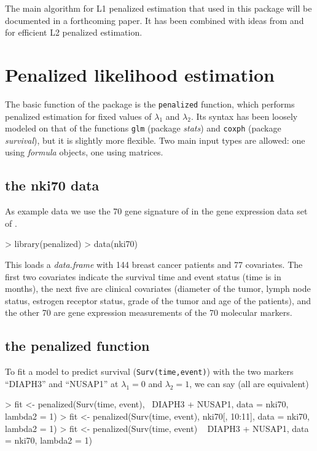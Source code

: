 \documentclass[a4paper]{article}
\newcommand{\Robject}[1]{{\texttt{#1}}}
\newcommand{\Rfunction}[1]{{\texttt{#1}}}
\newcommand{\Rpackage}[1]{{\textit{#1}}}
\newcommand{\Rclass}[1]{{\textit{#1}}}
\begin{document}
The main algorithm for L1 penalized estimation that used in this package will be documented in a forthcoming paper. It has been combined with ideas from \cite{Eilers2001} and \cite{Houwelingen2006} for efficient L2 penalized estimation.


\section{Penalized likelihood estimation}

The basic function of the package is the \Rfunction{penalized} function, which performs penalized estimation for fixed values of $\lambda_1$ and $\lambda_2$. Its syntax has been loosely modeled on that of the functions \Rfunction{glm} (package \Rpackage{stats}) and \Rfunction{coxph} (package \Rpackage{survival}), but it is slightly more flexible. Two main input types are allowed: one using \Rclass{formula} objects, one using matrices.

\subsection{the nki70 data}

As example data we use the 70 gene signature of \cite{Veer2002} in the gene expression data set of \cite{Vijver2002}.

\begin{Schunk}
\begin{Sinput}
> library(penalized)
> data(nki70)
\end{Sinput}
\end{Schunk}

This loads a \Rclass{data.frame} with 144 breast cancer patients and 77 covariates. The first two covariates indicate the survival time and event status (time is in months), the next five are clinical covariates (diameter of the tumor, lymph node status, estrogen receptor status, grade of the tumor and age of the patients), and the other 70 are gene expression measurements of the 70 molecular markers.

\subsection{the penalized function}

To fit a model to predict survival (\Robject{Surv(time,event)}) with the two markers ``DIAPH3'' and ``NUSAP1'' at $\lambda_1 = 0$ and $\lambda_2 = 1$, we can say (all are equivalent)

\begin{Schunk}
\begin{Sinput}
> fit <- penalized(Surv(time, event), ~DIAPH3 + NUSAP1, data = nki70, 
      lambda2 = 1)
> fit <- penalized(Surv(time, event), nki70[, 10:11], data = nki70, 
      lambda2 = 1)
> fit <- penalized(Surv(time, event) ~ DIAPH3 + NUSAP1, data = nki70, 
      lambda2 = 1)
\end{Sinput}
\end{Schunk}
\end{document}
